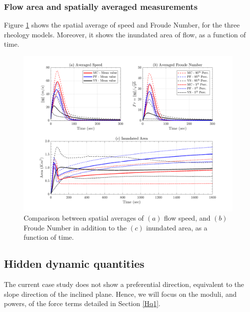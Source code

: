 \documentclass{article}
\begin{document}
\subsubsection{Flow area and spatially averaged measurements}
Figure \ref{fig:Colima-spatial} shows the spatial average of speed and Froude Number, for the three rheology models. Moreover, it shows the inundated area of flow, as a function of time.
\begin{figure}[H]
        \centering
        \includegraphics[width=1\textwidth]{BAF_VolcanDeColima/AveragedMeasurments/Averaged_MeasuresColima.png}
        \caption{Comparison between spatial averages of $(a)$ flow speed, and $(b)$ Froude Number in addition to the $(c)$ inundated area, as a function of time.}
        \label{fig:Colima-spatial}
\end{figure}

\subsection{Hidden dynamic quantities}\label{Hq2}
The current case study does not show a preferential direction, equivalent to the slope direction of the inclined plane. Hence, we will focus on the moduli, and powers, of the force terms detailed in Section \ref{Hq1}.
\newpage
\end{document}
